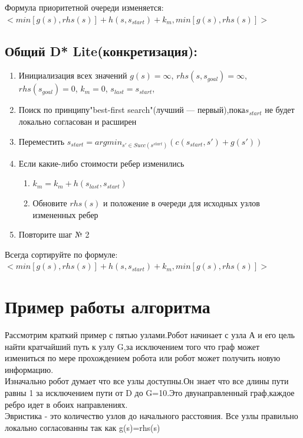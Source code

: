 \documentclass[12pt]{article}
\begin{document}
Формула приоритетной очереди изменяется:\\
$<min[g(s),rhs(s)]+h(s,s_{start})+k_m,min[g(s),rhs(s)]>$
\hypertarget{c1}{\subsection*{Общий D* Lite(конкретизация):}}
\begin{enumerate}
    \item Инициализация всех значений $g(s)=\infty$, $rhs(s,s_{goal})=\infty$, $rhs(s_{goal})=0$, $k_m=0$, $s_{last}=s_{start}$,
    \item Поиск по принципу"best-first search"(лучший — первый),пока$s_{start}$ не будет локально согласован и расширен
    \item Переместить $s_{start}=argmin_{s'\in Succ(s^{start})}(c(s_{start},s')+g(s'))$
     \item Если какие-либо стоимости ребер изменились
     \begin{enumerate} 
        \item $k_m=k_m+h(s_{last},s_{start})$
        \item Обновите $rhs(s)$ и положение в очереди для исходных узлов измененных ребер
    \end{enumerate}
    \item Повторите шаг № 2
\end{enumerate}
\begin{center}
   Всегда сортируйте по формуле:\\$<min[g(s),rhs(s)]+h(s,s_{start})+k_m,min[g(s),rhs(s)]>$\\
\end{center}


\begin{center}
   \hypertarget{a4}{\section*{Пример работы алгоритма}}
\end{center}
Рассмотрим краткий пример с пятью узлами.Робот начинает с узла А и его цель найти кратчайший путь к узлу G,за исключением того что граф может измениться по мере прохождением робота или робот может получить новую информацию.\\
Изначально робот думает что все узлы доступны.Он знает что все длины пути равны 1 за исключением пути от D до G=10.Это двунаправленный граф,каждое ребро идет в обоих направлениях.\\
Эвристика - это количество узлов до начального расстояния.
Все узлы правильно локально согласованны так как g(s)=rhs(s)\\
\end{document}
